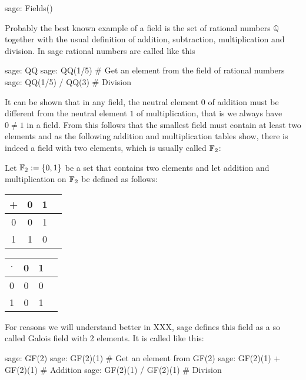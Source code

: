\begin{sagecommandline}
sage: Fields()
\end{sagecommandline}

\begin{example} Probably the best known example of a field is the set of rational numbers $\mathbb{Q}$ together with the usual definition of addition, subtraction, multiplication and division. In sage rational numbers are called like this
\begin{sagecommandline}
sage: QQ
sage: QQ(1/5) # Get an element from the field of rational numbers
sage: QQ(1/5) / QQ(3) # Division
\end{sagecommandline}
\end{example}
\begin{example} It can be shown that in any field, the neutral element $0$ of addition must be different from the neutral element $1$ of multiplication, that is we always have $0\neq 1$ in a field. From this follows that the smallest field must contain at least two elements and as the following addition and multiplication tables show, there is indeed a field with two elements, which is usually called $\mathbb{F}_2$:

Let $\mathbb{F}_2:=\{0,1 \}$ be a set that contains two elements and let addition and multiplication on $\mathbb{F}_2$ be defined as follows:
\begin{center}
  \begin{tabular}{c | c c c}
    + & 0 & 1 \\\hline
    0 & 0 & 1\\
    1 & 1 & 0 \\
  \end{tabular} \quad \quad \quad \quad
  \begin{tabular}{c | c c c}
$\cdot$ & 0 & 1 \\\hline
      0 & 0 & 0 \\
      1 & 0 & 1 \\
  \end{tabular}
\end{center}
For reasons we will understand better in XXX, sage defines this field as a so called Galois field with 2 elements. It is called like this:
\begin{sagecommandline}
sage: GF(2)
sage: GF(2)(1) # Get an element from GF(2)
sage: GF(2)(1) + GF(2)(1) # Addition
sage: GF(2)(1) / GF(2)(1) # Division
\end{sagecommandline}
\end{example}


